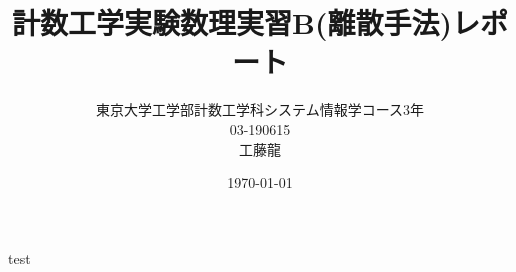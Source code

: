 \documentclass[11pt,a4paper]{jsarticle}
\title{計数工学実験数理実習B(離散手法)レポート}
\author{東京大学工学部計数工学科システム情報学コース3年\\03-190615\\工藤龍}
\date{\today}
\begin{document}
\maketitle

test
\end{document}
